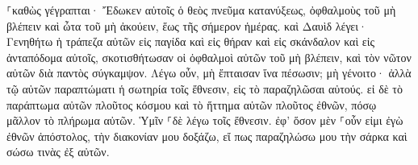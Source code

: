 \documentclass{openreader}
\begin{document}
⸀καθὼς γέγραπται· Ἔδωκεν αὐτοῖς ὁ θεὸς πνεῦμα κατανύξεως, ὀφθαλμοὺς τοῦ μὴ βλέπειν καὶ ὦτα τοῦ μὴ ἀκούειν, ἕως τῆς σήμερον ἡμέρας. 
καὶ Δαυὶδ λέγει· Γενηθήτω ἡ τράπεζα αὐτῶν εἰς παγίδα καὶ εἰς θήραν καὶ εἰς σκάνδαλον καὶ εἰς ἀνταπόδομα αὐτοῖς, 
σκοτισθήτωσαν οἱ ὀφθαλμοὶ αὐτῶν τοῦ μὴ βλέπειν, καὶ τὸν νῶτον αὐτῶν διὰ παντὸς σύγκαμψον. 
Λέγω οὖν, μὴ ἔπταισαν ἵνα πέσωσιν; μὴ γένοιτο· ἀλλὰ τῷ αὐτῶν παραπτώματι ἡ σωτηρία τοῖς ἔθνεσιν, εἰς τὸ παραζηλῶσαι αὐτούς. 
εἰ δὲ τὸ παράπτωμα αὐτῶν πλοῦτος κόσμου καὶ τὸ ἥττημα αὐτῶν πλοῦτος ἐθνῶν, πόσῳ μᾶλλον τὸ πλήρωμα αὐτῶν. 
Ὑμῖν ⸀δὲ λέγω τοῖς ἔθνεσιν. ἐφ’ ὅσον μὲν ⸀οὖν εἰμι ἐγὼ ἐθνῶν ἀπόστολος, τὴν διακονίαν μου δοξάζω, 
εἴ πως παραζηλώσω μου τὴν σάρκα καὶ σώσω τινὰς ἐξ αὐτῶν. 
\end{document}
